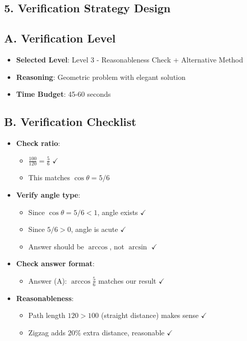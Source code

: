 \documentclass[11pt]{article}
\begin{document}
\begin{verificationbox}
\section*{5. Verification Strategy Design}

\subsection*{A. Verification Level}
\begin{itemize}[leftmargin=*]
    \item \textbf{Selected Level}: Level 3 - Reasonableness Check + Alternative Method
    \item \textbf{Reasoning}: Geometric problem with elegant solution
    \item \textbf{Time Budget}: 45-60 seconds
\end{itemize}

\subsection*{B. Verification Checklist}
\begin{itemize}[leftmargin=*]
    \item \textbf{Check ratio}:
    \begin{itemize}
        \item $\frac{100}{120} = \frac{5}{6}$ $\checkmark$
        \item This matches $\cos\theta = 5/6$
    \end{itemize}
    \item \textbf{Verify angle type}:
    \begin{itemize}
        \item Since $\cos\theta = 5/6 < 1$, angle exists $\checkmark$
        \item Since $5/6 > 0$, angle is acute $\checkmark$
        \item Answer should be $\arccos$, not $\arcsin$ $\checkmark$
    \end{itemize}
    \item \textbf{Check answer format}:
    \begin{itemize}
        \item Answer (A): $\arccos\frac{5}{6}$ matches our result $\checkmark$
    \end{itemize}
    \item \textbf{Reasonableness}:
    \begin{itemize}
        \item Path length $120 > 100$ (straight distance) makes sense $\checkmark$
        \item Zigzag adds $20\%$ extra distance, reasonable $\checkmark$
    \end{itemize}
\end{itemize}


\end{verificationbox}
\end{document}

